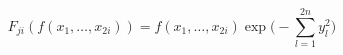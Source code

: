 \begin{equation}\label{eq320:ps}
	F_{ji}(f(x_{1},\ldots,x_{2i}))=f(x_{1},\ldots,x_{2i})\exp\Big(-\sum^{2n}_{l=1}y^{2}_{l}\Big)
\end{equation}

